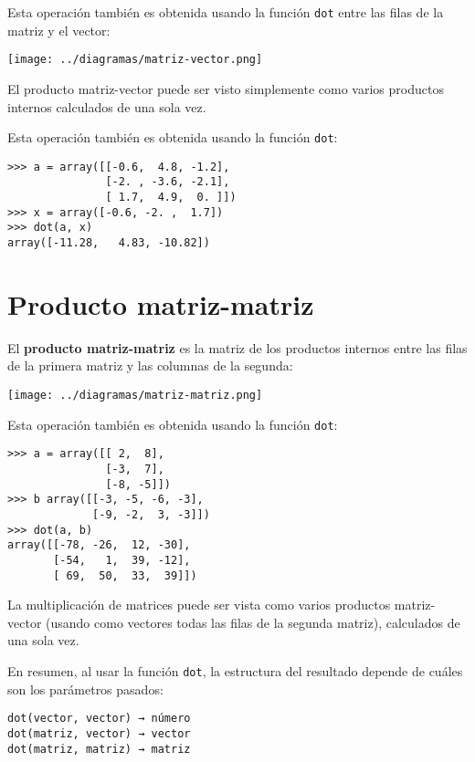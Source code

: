 Esta operación también es obtenida usando la función \lstinline!dot!
entre las filas de la matriz y el vector:

\texttt{[image: ../diagramas/matriz-vector.png]}

El producto matriz-vector puede ser visto simplemente como varios
productos internos calculados de una sola vez.

Esta operación también es obtenida usando la función \lstinline!dot!:

\begin{lstlisting}
>>> a = array([[-0.6,  4.8, -1.2],
               [-2. , -3.6, -2.1],
               [ 1.7,  4.9,  0. ]])
>>> x = array([-0.6, -2. ,  1.7])
>>> dot(a, x)
array([-11.28,   4.83, -10.82])
\end{lstlisting}

\section{Producto matriz-matriz}

El \textbf{producto matriz-matriz} es la matriz de los productos
internos entre las filas de la primera matriz y las columnas de la
segunda:

\texttt{[image: ../diagramas/matriz-matriz.png]}

Esta operación también es obtenida usando la función \lstinline!dot!:

\begin{lstlisting}
>>> a = array([[ 2,  8],
               [-3,  7],
               [-8, -5]])
>>> b array([[-3, -5, -6, -3],
             [-9, -2,  3, -3]])
>>> dot(a, b)
array([[-78, -26,  12, -30],
       [-54,   1,  39, -12],
       [ 69,  50,  33,  39]])
\end{lstlisting}

La multiplicación de matrices puede ser vista como varios productos
matriz-vector (usando como vectores todas las filas de la segunda
matriz), calculados de una sola vez.

En resumen, al usar la función \lstinline!dot!, la estructura del
resultado depende de cuáles son los parámetros pasados:

\begin{lstlisting}
dot(vector, vector) → número
dot(matriz, vector) → vector
dot(matriz, matriz) → matriz
\end{lstlisting}

